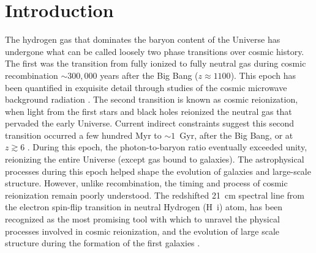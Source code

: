 \documentclass[
reprint,
superscriptaddress,
amsmath,
amssymb,
aps,
prd
]{revtex4-1}
\begin{document}
\pacs{}%


\maketitle


\section{Introduction}\label{sec:intro}

The hydrogen gas that dominates the baryon content of the Universe has undergone what can be called loosely two phase transitions over cosmic history. The first was the transition from fully ionized to fully neutral gas during cosmic recombination $\sim 300,000$ years after the Big Bang ($z\approx 1100$). This epoch has been quantified in exquisite detail through studies of the cosmic microwave background radiation \cite{planck15i}. The second transition is known as cosmic reionization, when light from the first stars and black holes reionized the neutral gas that pervaded the early Universe. Current indirect constraints suggest this second transition occurred a few hundred Myr to $\sim 1$~Gyr, after the Big Bang, or at $z\gtrsim 6$ \cite{gre17}. During this epoch, the photon-to-baryon ratio eventually exceeded unity, reionizing the entire Universe (except gas bound to galaxies). The astrophysical processes during this epoch helped shape the evolution of galaxies and large-scale structure. However, unlike recombination, the timing and process of cosmic reionization remain poorly understood.  The redshifted 21~cm spectral line from the electron spin-flip transition in neutral Hydrogen (H~{\sc i}) atom, has been recognized as the most promising tool with which to unravel the physical processes involved in cosmic reionization, and the evolution of large scale structure during the formation of the first galaxies \cite{sun72,sco90,mad97,toz00,ili02,fan02,fan06,bar07,mor10}.
\end{document}
